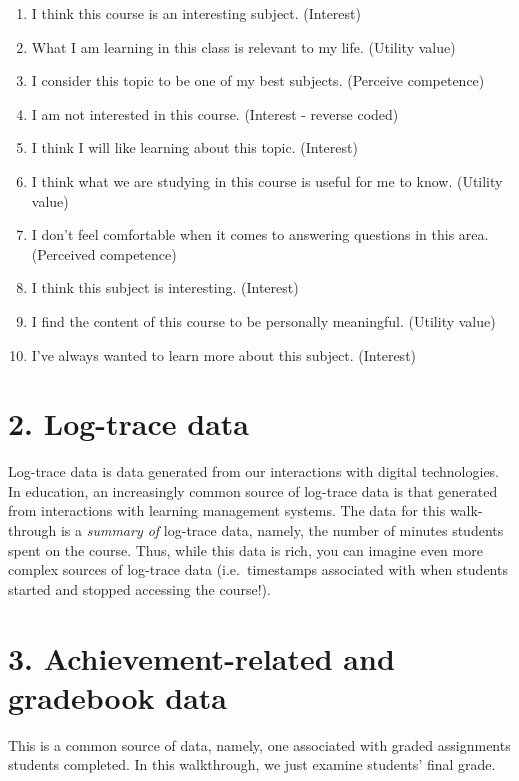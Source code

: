 \documentclass[]{book}
\providecommand{\tightlist}{%
  \setlength{\itemsep}{0pt}\setlength{\parskip}{0pt}}
\begin{document}
\begin{enumerate}
\def\labelenumi{\arabic{enumi}.}
\tightlist
\item
  I think this course is an interesting subject. (Interest)
\item
  What I am learning in this class is relevant to my life. (Utility
  value)
\item
  I consider this topic to be one of my best subjects. (Perceive
  competence)
\item
  I am not interested in this course. (Interest - reverse coded)
\item
  I think I will like learning about this topic. (Interest)
\item
  I think what we are studying in this course is useful for me to know.
  (Utility value)
\item
  I don't feel comfortable when it comes to answering questions in this
  area. (Perceived competence)
\item
  I think this subject is interesting. (Interest)
\item
  I find the content of this course to be personally meaningful.
  (Utility value)
\item
  I've always wanted to learn more about this subject. (Interest)
\end{enumerate}

\section{2. Log-trace data}\label{log-trace-data}

Log-trace data is data generated from our interactions with digital
technologies. In education, an increasingly common source of log-trace
data is that generated from interactions with learning management
systems. The data for this walk-through is a \emph{summary of} log-trace
data, namely, the number of minutes students spent on the course. Thus,
while this data is rich, you can imagine even more complex sources of
log-trace data (i.e.~timestamps associated with when students started
and stopped accessing the course!).

\section{3. Achievement-related and gradebook
data}\label{achievement-related-and-gradebook-data}

This is a common source of data, namely, one associated with graded
assignments students completed. In this walkthrough, we just examine
students' final grade.
\end{document}
